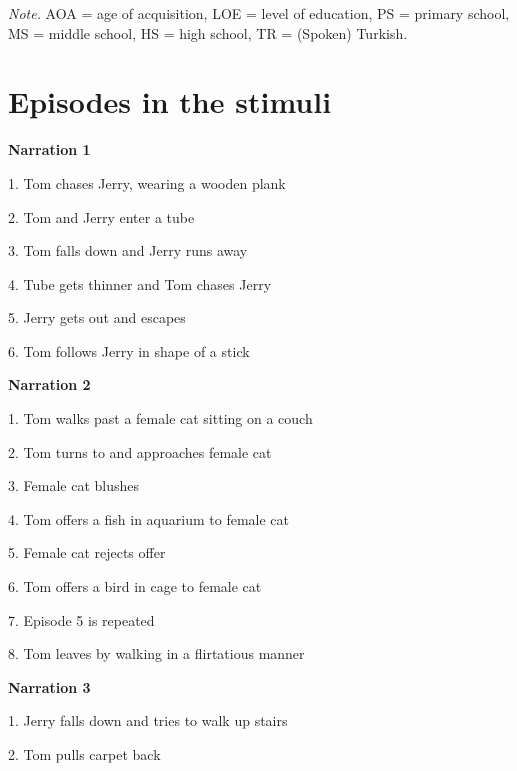 \documentclass[review]{elsarticle} %
\begin{document}
\begin{table}[hbt!]
\begin{center}
\begin{threeparttable}
{}

\begin{tablenotes}[para]
\normalsize{\textit{Note.} AOA = age of acquisition, LOE = level of education, PS = primary school, MS = middle school, HS = high school, TR = (Spoken) Turkish.}
\end{tablenotes}

\end{threeparttable}
\end{center}

\end{table}

\clearpage

\setlength{\columnsep}{10pt}
\twocolumn
\linespread{1}
\justifying
\footnotesize

\hypertarget{episodes-in-the-stimuli}{%
\section{Episodes in the stimuli}\label{episodes-in-the-stimuli}}

\label{section:b}

\textbf{Narration 1}

1. Tom chases Jerry, wearing a wooden plank

2. Tom and Jerry enter a tube

3. Tom falls down and Jerry runs away

4. Tube gets thinner and Tom chases Jerry

5. Jerry gets out and escapes

6. Tom follows Jerry in shape of a stick

\textbf{Narration 2}

1. Tom walks past a female cat sitting on a couch

2. Tom turns to and approaches female cat

3. Female cat blushes

4. Tom offers a fish in aquarium to female cat

5. Female cat rejects offer

6. Tom offers a bird in cage to female cat

7. Episode 5 is repeated

8. Tom leaves by walking in a flirtatious manner

\textbf{Narration 3}

1. Jerry falls down and tries to walk up stairs

2. Tom pulls carpet back
\end{document}
